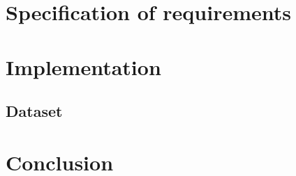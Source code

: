 \documentclass[10pt,oneside,english,a4paper]{article}
\begin{document}
\clearpage
\section{Specification of requirements}

\clearpage{}
\section{Implementation}

\subsection{Dataset}


\clearpage{}
\section{Conclusion}


\clearpage
\thispagestyle{empty}
\mbox{}
\clearpage








\clearpage 
\normalsize 
 
 
\nocite{*}
\end{document}
